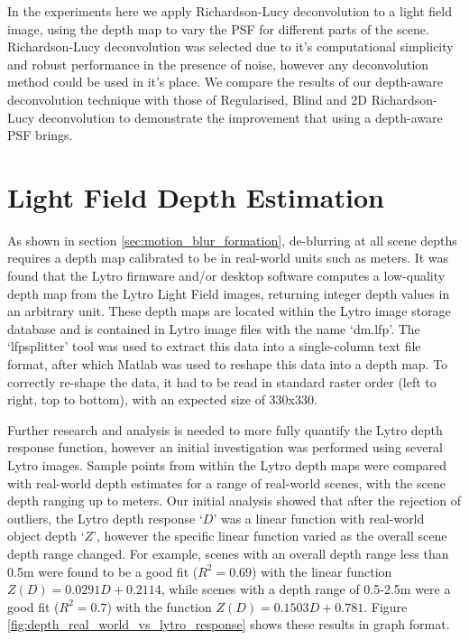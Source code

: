 In the experiments here we apply Richardson-Lucy deconvolution to a light field image, using the depth map to vary the PSF for different parts of the scene.
Richardson-Lucy deconvolution was selected due to it's computational simplicity and robust performance in the presence of noise, however any deconvolution method could be used in it's place.
We compare the results of our depth-aware deconvolution technique with those of Regularised, Blind and 2D Richardson-Lucy deconvolution to demonstrate the improvement that using a depth-aware PSF brings.

\section{Light Field Depth Estimation}
\label{sec:light_field_depth_estimation}

As shown in section \ref{sec:motion_blur_formation}, de-blurring at all scene depths requires a depth map calibrated to be in real-world units such as meters.
It was found that the Lytro firmware and/or desktop software computes a low-quality depth map from the Lytro Light Field images, returning integer depth values in an arbitrary unit.
These depth maps are located within the Lytro image storage database and is contained in Lytro image files with the name \enquote*{dm.lfp}.
The \enquote*{lfpsplitter} tool \cite{patel2013lfptools} was used to extract this data into a single-column text file format, after which Matlab was used to reshape this data into a depth map.
To correctly re-shape the data, it had to be read in standard raster order (left to right, top to bottom), with an expected size of 330x330.

Further research and analysis is needed to more fully quantify the Lytro depth response function, however an initial investigation was performed using several Lytro images.
Sample points from within the Lytro depth maps were compared with real-world depth estimates for a range of real-world scenes, with the scene depth ranging up to  meters.
Our initial analysis showed that after the rejection of outliers, the Lytro depth response \enquote*{$D$} was a linear function with real-world object depth \enquote*{$Z$}, however the specific linear function varied as the overall scene depth range changed.
For example, scenes with an overall depth range less than 0.5m were found to be a good fit ($R^2 = 0.69$) with the linear function $Z(D) = 0.0291 D + 0.2114$, while scenes with a depth range of 0.5-2.5m were a good fit ($R^2 = 0.7$) with the function $Z(D) = 0.1503 D + 0.781$.
Figure \ref{fig:depth_real_world_vs_lytro_response} shows these results in graph format.

